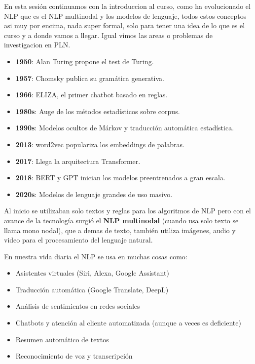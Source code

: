 \documentclass[11pt,letterpaper]{article}
\begin{document}
\vspace{2em}

\newpage


\begin{quick_sum}
    En esta sesión continuamos con la introduccion al curso, como ha evolucionado el NLP
    que es el NLP multinodal y los modelos de lenguaje, todos estos conceptos asi muy por 
    encima, nada super formal, solo para tener una idea de lo que es el curso y a donde vamos a llegar.
    Igual vimos las areas o problemas de investigacion en PLN.
\end{quick_sum}

\vspace{2em}

\begin{itemize}
    \item \textbf{1950}: Alan Turing propone el test de Turing.
    \item \textbf{1957}: Chomsky publica su gramática generativa.
    \item \textbf{1966}: ELIZA, el primer chatbot basado en reglas.
    \item \textbf{1980s}: Auge de los métodos estadísticos sobre corpus.
    \item \textbf{1990s}: Modelos ocultos de Márkov y traducción
    automática estadística.
    \item \textbf{2013}: word2vec populariza los embeddings de palabras.
    \item \textbf{2017}: Llega la arquitectura Transformer.
    \item \textbf{2018}: BERT y GPT inician los modelos preentrenados a
    gran escala.
    \item \textbf{2020s}: Modelos de lenguaje grandes de uso masivo.
\end{itemize}

Al inicio se utilizaban solo textos y reglas para los algoritmos de
NLP pero con el avance de la tecnología surgió el \textbf{NLP multinodal} (cuando usa solo texto se llama mono nodal), que a demas
de texto, también utiliza imágenes, audio y video para el procesamiento del lenguaje natural.

En nuestra vida diaria el NLP se usa en muchas cosas como:

\begin{itemize}
    \item Asistentes virtuales (Siri, Alexa, Google Assistant)
    \item Traducción automática (Google Translate, DeepL)
    \item Análisis de sentimientos en redes sociales
    \item Chatbots y atención al cliente automatizada (aunque a veces es deficiente)
    \item Resumen automático de textos
    \item Reconocimiento de voz y transcripción
\end{itemize}
\end{document}

